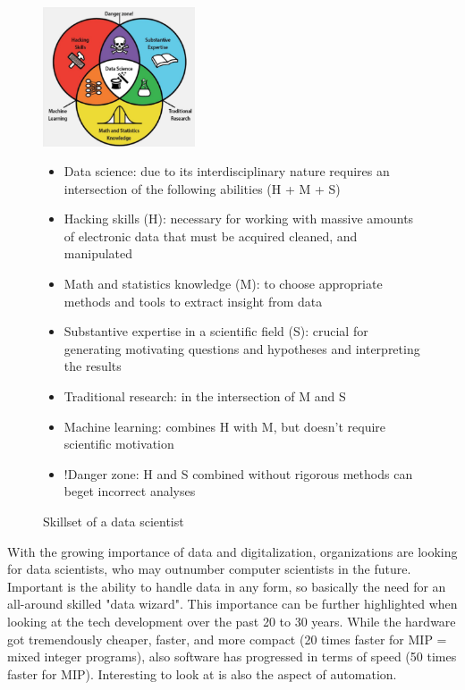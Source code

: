 \begin{figure}[H]
  \centering
  \includegraphics[width=0.4\textwidth]{assets/intro/data_scientist_skillset.png} 
  \begin{itemize}
    \item Data science: due to its interdisciplinary nature requires an intersection of the following abilities (H + M + S)
    \item Hacking skills (H): necessary for working with massive amounts of electronic data that must be acquired cleaned, and manipulated
    \item Math and statistics knowledge (M): to choose appropriate methods and tools to extract insight from data
    \item Substantive expertise in a scientific field (S): crucial for generating motivating questions and hypotheses and interpreting the results
    \item Traditional research: in the intersection of M and S
    \item Machine learning: combines H with M, but doesn't require scientific motivation
    \item !Danger zone: H and S combined without rigorous methods can beget incorrect analyses
  \end{itemize}
  \caption{Skillset of a data scientist}
  \label{fig:0_skillset}
\end{figure}

With the growing importance of data and digitalization, organizations are looking for data scientists, who may outnumber computer scientists in the future. Important is the ability to handle data in any form, so basically the need for an all-around skilled "data wizard". This importance can be further highlighted when looking at the tech development over the past 20 to 30 years. While the hardware got tremendously cheaper, faster, and more compact (20 times faster for MIP = mixed integer programs), also software has progressed in terms of speed (50 times faster for MIP). Interesting to look at is also the aspect of automation.

